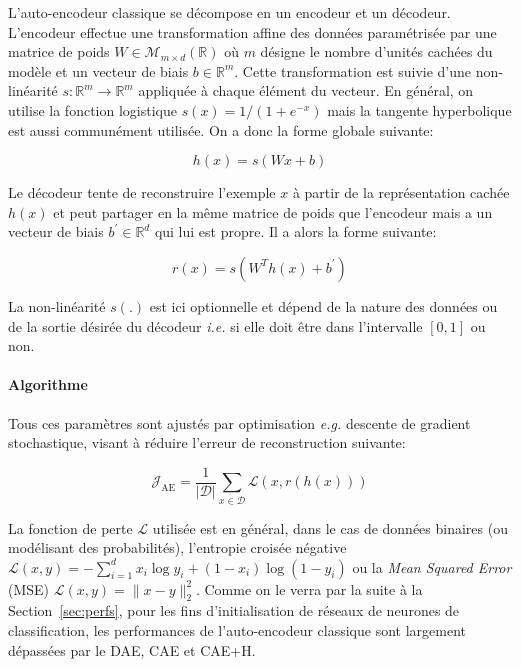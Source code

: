 L'auto-encodeur classique se décompose en un encodeur et un décodeur.
L'encodeur effectue une transformation affine des données paramétrisée par une
matrice de poids $W\in\mathcal{M}_{m\times d}(\mathbb{R})$ où $m$ désigne le
nombre d'unités cachées du modèle et un vecteur de biais $b\in\mathbb{R}^m$.
Cette transformation est suivie d'une non-linéarité $s:\mathbb{R}^m \rightarrow
\mathbb{R}^m$ appliquée à chaque élément du vecteur. En général, on utilise la
fonction logistique $s(x)=1/(1+e^{-x})$ mais la tangente hyperbolique est aussi
communément utilisée. On a donc la forme globale suivante:

\begin{equation}
h(x)=s(Wx+b)
\end{equation}

Le décodeur tente de reconstruire l'exemple $x$ à partir de la représentation
cachée $h(x)$ et peut partager en la m\^eme matrice de poids que l'encodeur
mais a un vecteur de biais $b^{'}\in\mathbb{R}^d$ qui lui est propre. Il a
alors la forme suivante:

\begin{equation}
r(x)=s(W^{T} h(x)+b^{'})
\end{equation} 

La non-linéarité $s(.)$ est ici optionnelle et dépend de la nature des données
ou de la sortie désirée du décodeur \textit{i.e.} si elle doit \^etre dans
l'intervalle $[0,1]$ ou non.  \\

\paragraph{Algorithme}
Tous ces paramètres sont ajustés par optimisation \textit{e.g.} descente de
gradient stochastique, visant à réduire l'erreur de reconstruction suivante:

\begin{equation}
\mathcal{J}_{\textrm{AE}} = \frac{1}{\vert \mathcal{D}\vert}\sum_{x\in\mathcal{D}}\mathcal{L}(x,r(h(x)))
\label{eq:ae}
\end{equation}

La fonction de perte $\mathcal{L}$ utilisée est en général, dans le cas de
données binaires (ou modélisant des probabilités), l'entropie croisée négative
$\mathcal{L}(x,y) = -\sum_{i=1}^d x_i\log y_i + (1-x_i)\log(1-y_i)$ ou la
\textit{Mean Squared Error} (MSE) $\mathcal{L}(x,y) = \| x-y\|^2_2$. Comme on
le verra par la suite à la Section~\ref{sec:perfs}, pour les fins
d'initialisation de réseaux de neurones de classification, les performances de
l'auto-encodeur classique sont largement dépassées par le DAE, CAE et CAE+H.

